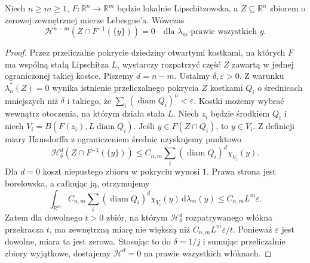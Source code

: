 \begin{lemat}
\label{lem:null-fibres-lipschitz-28}
Niech $n\ge m\ge1$, $F:\mathbb R^n\to\mathbb R^m$
będzie lokalnie Lipschitzowska, a
$Z\subseteq\mathbb R^n$ zbiorem o zerowej zewnętrznej
mierze Lebesgue'a. Wówczas
\[
 \mathcal H^{n-m}(Z\cap F^{-1}(\{y\}))=0
 \quad\text{dla }\lambda_m\text{-prawie wszystkich }y.
\]
\end{lemat}
\begin{proof}
Przez przeliczalne pokrycie dziedziny otwartymi
kostkami, na których $F$ ma wspólną stałą
Lipschitza $L$, wystarczy rozpatrzyć część $Z$
zawartą w jednej ograniczonej takiej kostce.
Piszemy $d=n-m$. Ustalmy $\delta,\varepsilon>0$.
Z warunku $\lambda_n^*(Z)=0$ wynika istnienie
przeliczalnego pokrycia $Z$ kostkami $Q_i$
o średnicach mniejszych niż $\delta$ i takiego, że
$\sum_i(\operatorname{diam}Q_i)^n<\varepsilon$.
Kostki możemy wybrać wewnątrz otoczenia,
na którym działa stała $L$.
Niech $z_i$ będzie środkiem $Q_i$ i niech
$V_i=B(F(z_i),L\operatorname{diam}Q_i)$.
Jeśli $y\in F(Z\cap Q_i)$, to $y\in V_i$.
Z definicji miary Hausdorffa z ograniczeniem
średnic uzyskujemy punktowo
\[
 \mathcal H^d_\delta(Z\cap F^{-1}(\{y\}))
 \le C_{n,m}\sum_i(\operatorname{diam}Q_i)^d\chi_{V_i}(y).
\]
Dla $d=0$ koszt niepustego zbioru w pokryciu
wynosi $1$. Prawa strona jest borelowska,
a całkując ją, otrzymujemy
\[
 \int_{\mathbb R^m}C_{n,m}\sum_i
 (\operatorname{diam}Q_i)^d\chi_{V_i}(y)
 \,\mathrm d\lambda_m(y)
 \le C_{n,m}L^m\varepsilon.
\]
Zatem dla dowolnego $t>0$ zbiór, na którym
$\mathcal H^d_\delta$ rozpatrywanego włókna
przekracza $t$, ma zewnętrzną miarę nie większą
niż $C_{n,m}L^m\varepsilon/t$. Ponieważ
$\varepsilon$ jest dowolne, miara ta jest zerowa.
Stosując to do $\delta=1/j$ i sumując
przeliczalnie zbiory wyjątkowe, dostajemy
$\mathcal H^d=0$ na prawie wszystkich włóknach.
\end{proof}

